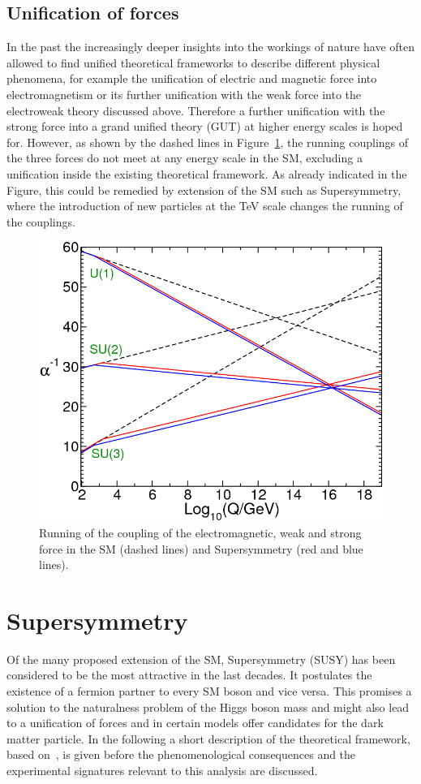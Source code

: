 \subsection*{Unification of forces}
In the past the increasingly deeper insights into the workings of nature have often allowed to find unified theoretical frameworks to describe different physical phenomena, for example the unification of electric and magnetic force into electromagnetism or its further unification with the weak force into the electroweak theory discussed above. Therefore a further unification with the strong force into a grand unified theory (GUT) at higher energy scales is hoped for. However, as shown by the dashed lines in Figure~\ref{fit:unification}, the running couplings of the three forces do not meet at any energy scale in the SM, excluding a unification inside the existing theoretical framework. As already indicated in the Figure, this could be remedied by extension of the SM such as Supersymmetry, where the introduction of new particles at the TeV scale changes the running of the couplings.
\begin{figure}
\centering
\includegraphics[scale=0.35]{plots/THEO/unification.png}
\caption{Running of the coupling of the electromagnetic, weak and strong force in the SM (dashed lines) and Supersymmetry (red and blue lines)\cite{Martin:1997ns}.}
\label{fit:unification}
\end{figure}
\section{Supersymmetry}
Of the many proposed extension of the SM, Supersymmetry (SUSY) has been considered to be the most attractive in the last decades. It postulates the existence of a fermion partner to every SM boson and vice versa. This promises a solution to the naturalness problem of the Higgs boson mass and might also lead to a unification of forces and in certain models offer candidates for the dark matter particle. In the following a short description of the theoretical framework, based on~\cite{Martin:1997ns}, is given before the phenomenological consequences and the experimental signatures relevant to this analysis are discussed.
